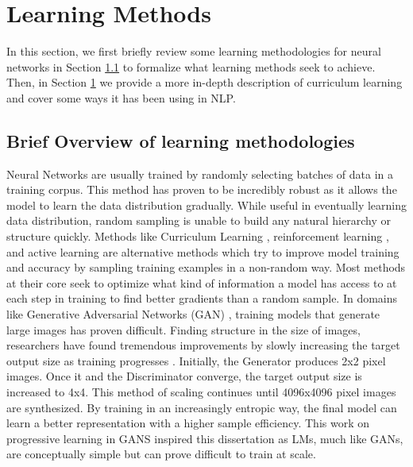 \section{Learning Methods}
\label{chap:prior:sec:cl}
In this section, we first briefly review some learning methodologies for neural networks in Section \ref{chap:prior:sec:cl:overview} to formalize what learning methods seek to achieve. Then, in Section \ref{chap:prior:sec:cl} we provide a more in-depth description of curriculum learning and cover some ways it has been using in NLP. 
\subsection{Brief Overview of learning methodologies}
\label{chap:prior:sec:cl:overview}
Neural Networks are usually trained by randomly selecting batches of data in a training corpus. This method has proven to be incredibly robust as it allows the model to learn the data distribution gradually. While useful in eventually learning data distribution, random sampling is unable to build any natural hierarchy or structure quickly. Methods like Curriculum Learning \cite{Bengio2009CurriculumL}, reinforcement learning \cite{Sutton1998ReinforcementLA}, and active learning \cite{Cohn1994ActiveLW} are alternative methods which try to improve model training and accuracy by sampling training examples in a non-random way. Most methods at their core seek to optimize what kind of information a model has access to at each step in training to find better gradients than a random sample. In domains like Generative Adversarial Networks (GAN) \cite{Goodfellow2014GenerativeAN}, training models that generate large images has proven difficult. Finding structure in the size of images, researchers have found tremendous improvements by slowly increasing the target output size as training progresses \cite{Karras2017ProgressiveGO}. Initially, the Generator produces 2x2 pixel images. Once it and the Discriminator converge, the target output size is increased to 4x4. This method of scaling continues until 4096x4096 pixel images are synthesized. By training in an increasingly entropic way, the final model can learn a better representation with a higher sample efficiency. This work on progressive learning in GANS inspired this dissertation as LMs, much like GANs, are conceptually simple but can prove difficult to train at scale. 
